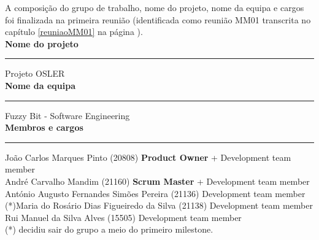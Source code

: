 A composição do grupo de trabalho, nome do projeto, nome da equipa e cargos foi finalizada na primeira reunião (identificada como reunião MM01 transcrita no capítulo \ref{reuniaoMM01} na página \pageref{reuniaoMM01}).\\[4mm]

\noindent \textbf{Nome do projeto}\\[1mm]
\noindent \rule{\linewidth}{0.4pt}
\noindent Projeto OSLER \\[4mm]

\noindent \textbf{Nome da equipa}\\[1mm]
\noindent \rule{\linewidth}{0.4pt}
\noindent Fuzzy Bit - Software Engineering \\[4mm]

\noindent \textbf{Membros e cargos}\\[1mm]
\noindent \rule{\linewidth}{0.4pt}
\noindent João Carlos Marques Pinto (20808) \textbf{Product Owner} + Development team member\\[1mm]
\noindent André Carvalho Mandim (21160) \textbf{Scrum Master} + Development team member\\[1mm]
\noindent António Augusto Fernandes Simões Pereira (21136) Development team member \\[1mm]
\noindent (*)Maria do Rosário Dias Figueiredo da Silva (21138) Development team member \\[1mm]
\noindent Rui Manuel da Silva Alves (15505) Development team member \\[2mm]

\noindent (*) decidiu sair do grupo a meio do primeiro milestone. \\[4mm]


